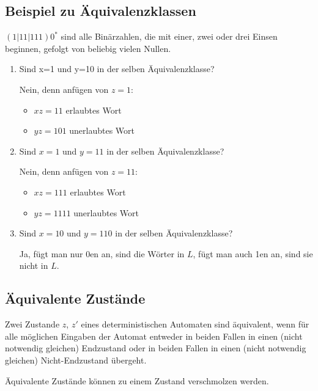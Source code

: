 \documentclass{lehramt-informatik-haupt}
\begin{document}
\subsection{Beispiel zu Äquivalenzklassen}

$(1|11|111)0^*$ sind alle Binärzahlen, die mit einer, zwei oder drei
Einsen beginnen, gefolgt von beliebig vielen Nullen.

\begin{enumerate}
\item Sind x=1 und y=10 in der selben Äquivalenzklasse?

Nein, denn anfügen von $z=1$:

\begin{itemize}
\item $xz = 11$ erlaubtes Wort

\item $yz = 101$ unerlaubtes Wort
\end{itemize}

\item Sind $x=1$ und $y=11$ in der selben Äquivalenzklasse?

Nein, denn anfügen von $z=11$:

\begin{itemize}
\item $xz = 111$ erlaubtes Wort
\item $yz = 1111$ unerlaubtes Wort
\end{itemize}

\item Sind $x=10$ und $y=110$ in der selben Äquivalenzklasse?

Ja, fügt man nur 0en an, sind die Wörter in $L$, fügt man auch 1en an,
sind sie nicht in $L$.
\end{enumerate}

\subsection{Äquivalente Zustände}

Zwei Zustande $z$, $z'$ eines deterministischen Automaten sind
äquivalent, wenn für alle möglichen Eingaben der Automat entweder in
beiden Fallen in einen (nicht notwendig gleichen) Endzustand oder in
beiden Fallen in einen (nicht notwendig gleichen) Nicht-Endzustand
übergeht.

Äquivalente Zustände können zu einem Zustand verschmolzen
werden.

%
\end{document}
